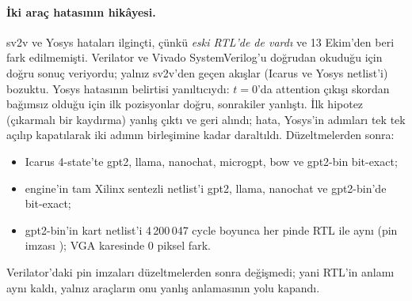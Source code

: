 \paragraph{İki araç hatasının hikâyesi.} sv2v ve Yosys hataları ilginçti, çünkü \emph{eski RTL'de de vardı} ve 13 Ekim'den beri fark edilmemişti. Verilator ve Vivado SystemVerilog'u doğrudan okuduğu için doğru sonuç veriyordu; yalnız sv2v'den geçen akışlar (Icarus ve Yosys netlist'i) bozuktu. Yosys hatasının belirtisi yanıltıcıydı: $t=0$'da attention çıkışı skordan bağımsız olduğu için ilk pozisyonlar doğru, sonrakiler yanlıştı. İlk hipotez (çıkarmalı bir kaydırma) yanlış çıktı ve geri alındı; hata, Yosys'in adımları tek tek açılıp kapatılarak iki adımın birleşimine kadar daraltıldı. Düzeltmelerden sonra:
\begin{itemize}
  \item Icarus 4-state'te gpt2, llama, nanochat, microgpt, bow ve gpt2-bin bit-exact;
  \item engine'in tam Xilinx sentezli netlist'i gpt2, llama, nanochat ve gpt2-bin'de bit-exact;
  \item gpt2-bin'in kart netlist'i 4\,200\,047 cycle boyunca her pinde RTL ile aynı (pin imzası ); VGA karesinde 0 piksel fark.
\end{itemize}
Verilator'daki pin imzaları düzeltmelerden sonra değişmedi; yani RTL'in anlamı aynı kaldı, yalnız araçların onu yanlış anlamasının yolu kapandı.

